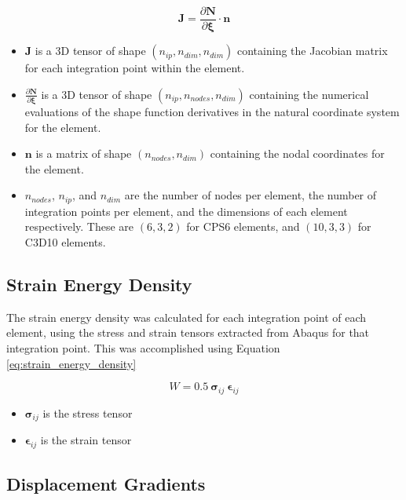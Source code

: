 \begin{equation}\label{eq:jacobian_matrix}
	\bm{J} = \frac{\partial\bm{N}}{\partial\bm{\xi}} \cdot \bm{n}
\end{equation}

\begin{itemize}
	\item $\bm{J}$ is a 3D tensor of shape $(n_{ip}, n_{dim}, n_{dim})$ containing the Jacobian matrix for each integration point within the element.
	\item $\frac{\partial\bm{N}}{\partial\bm{\xi}}$ is a 3D tensor of shape $(n_{ip}, n_{nodes}, n_{dim})$ containing the numerical evaluations of the shape function derivatives in the natural coordinate system for the element.
	\item $\bm{n}$ is a matrix of shape $(n_{nodes}, n_{dim})$ containing the nodal coordinates for the element.
	\item $n_{nodes}$, $n_{ip}$, and $n_{dim}$ are the number of nodes per element, the number of integration points per element, and the dimensions of each element respectively. These are $(6, 3, 2)$ for CPS6 elements, and $(10, 3, 3)$ for C3D10 elements.
\end{itemize}


\subsection{Strain Energy Density}

The strain energy density was calculated for each integration point of each element, using the stress and strain tensors extracted from Abaqus for that integration point. This was accomplished using Equation \ref{eq:strain_energy_density}

\begin{equation}\label{eq:strain_energy_density}
	W = 0.5\ \bm{\sigma}_{ij}\ \bm{\epsilon}_{ij}
\end{equation}

\begin{itemize}
	\item $\bm{\sigma}_{ij}$ is the stress tensor
	\item $\bm{\epsilon}_{ij}$ is the strain tensor
\end{itemize}

\subsection{Displacement Gradients}

